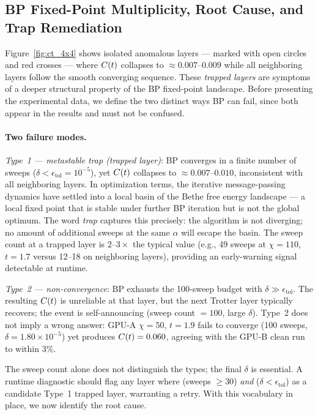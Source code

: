 \subsection{BP Fixed-Point Multiplicity, Root Cause, and Trap Remediation}
\label{sec:bp_convergence}

Figure~\ref{fig:ct_4x4} shows isolated anomalous layers --- marked with open circles
and red crosses --- where $C(t)$ collapses to $\approx 0.007$--$0.009$ while all
neighboring layers follow the smooth converging sequence.
These \emph{trapped layers} are symptoms of a deeper structural property of the
BP fixed-point landscape.
Before presenting the experimental data, we define the two distinct ways BP can
fail, since both appear in the results and must not be confused.

\paragraph{Two failure modes.}
\emph{Type~1 --- metastable trap (trapped layer)}: BP converges in a finite
number of sweeps ($\delta < \epsilon_{\mathrm{tol}} = 10^{-5}$), yet $C(t)$
collapses to $\approx 0.007$--$0.010$, inconsistent with all neighboring layers.
In optimization terms, the iterative message-passing dynamics have settled into
a local basin of the Bethe free energy landscape --- a local fixed point that is
stable under further BP iteration but is not the global optimum.
The word \emph{trap} captures this precisely: the algorithm is not diverging;
no amount of additional sweeps at the same $\alpha$ will escape the basin.
The sweep count at a trapped layer is $2$--$3\times$ the typical value
(e.g., 49 sweeps at $\chi=110$, $t=1.7$ versus 12--18 on neighboring layers),
providing an early-warning signal detectable at runtime.

\emph{Type~2 --- non-convergence}: BP exhausts the 100-sweep budget with
$\delta \gg \epsilon_{\mathrm{tol}}$.
The resulting $C(t)$ is unreliable at that layer, but the next Trotter layer
typically recovers; the event is self-announcing (sweep count $= 100$, large
$\delta$).
Type~2 does not imply a wrong answer: GPU-A $\chi=50$, $t=1.9$ fails to
converge (100 sweeps, $\delta = 1.80\times10^{-5}$) yet produces $C(t) = 0.060$,
agreeing with the GPU-B clean run to within 3\%.

The sweep count alone does not distinguish the types; the final $\delta$ is
essential.
A runtime diagnostic should flag any layer where (sweeps $\geq 30$) \emph{and}
($\delta < \epsilon_{\mathrm{tol}}$) as a candidate Type~1 trapped layer,
warranting a retry.
With this vocabulary in place, we now identify the root cause.

